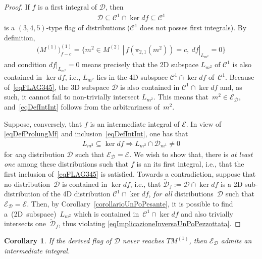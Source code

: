 \documentclass[pdftex]{sigma}
\newcommand{\C}{\mathcal{C}}
\newcommand{\D}{\mathcal{D}}
\newcommand{\E}{\mathcal{E}}
\newcommand{\Ddue}{{\check{\mathcal{D}}}}
\numberwithin{equation}{section}
\newtheorem{Corollary}[Theorem]{Corollary}
\begin{document}
\begin{proof}
 If $f$ is a f\/irst integral of $\D$, then
 \begin{gather}\label{eqFLAG345}
\D\subseteq \C^1\cap \ker df \subseteq \C^1
\end{gather}
is a $(3,4,5)$-type f\/lag of distributions ($\C^1$ does not posses f\/irst integrals). By def\/inition,
\begin{gather}\label{eqDefProlungMf}
\big(M^{(1)}\big)_{f-c}^{(1)}=\big\{m^2\in M^{(2)}\,|\, f(\pi_{2,1}(m^2))=c,\ df|_{L_{m^2}}=0\big\}
\end{gather}
and condition $df|_{L_{m^2}}=0$ means precisely that the 2D subspace $L_{m^2}$ of $\C^1$ is also contained in $\ker df$, i.e., $L_{m^2}$ lies in the 4D subspace $\C^1\cap \ker df$ of~$\C^1$. Because of~\eqref{eqFLAG345}, the 3D subspace $\D$ is also contained in $\C^1\cap \ker df$ and, as such, it cannot fail to non-trivially intersect $L_{m^2}$. This means that~$m^2\in\E_\D$, and~\eqref{eqDefIntInt} follows from the arbitrariness of~$m^2$.

Suppose, conversely, that $f$ is an intermediate integral of $\E$. In view of \eqref{eqDefProlungMf} and inclusion~\eqref{eqDefIntInt}, one has that
\begin{gather}\label{eqImplicazioneInversaUnPoPezzottata}
L_{m^2}\subseteq\ker df\Rightarrow L_{m^2}\cap\D_{m^1}\neq 0
\end{gather}
for \emph{any} distribution $\D$ such that $\E_\D=\E$. We wish to show that, there is \emph{at least one} among these distributions such that $f$ is an its f\/irst integral, i.e., that the f\/irst inclusion of~\eqref{eqFLAG345} is satisf\/ied. Towards a contradiction, suppose that no distribution~$\D$ is contained in $\ker df$, i.e., that $\Ddue_f:=\D\cap\ker df$ is a 2D sub-distribution of the 4D distribution $\C^1\cap\ker df$, \emph{for all} distributions~$\D$ such that $\E_\D=\E$. Then, by Corollary~\ref{corollarioUnPoPesante}, it is possible to f\/ind a~(2D~subspace)~$L_{m^2}$ which is contained in~$\C^1\cap\ker df$ and also trivially intersects one~$\Ddue_f$, thus violating \eqref{eqImplicazioneInversaUnPoPezzottata}.
\end{proof}

\begin{Corollary}
 If the derived flag of $\D$ never reaches $TM^{(1)}$, then $\E_\D$ admits an intermediate integral.
\end{Corollary}
\end{document}
